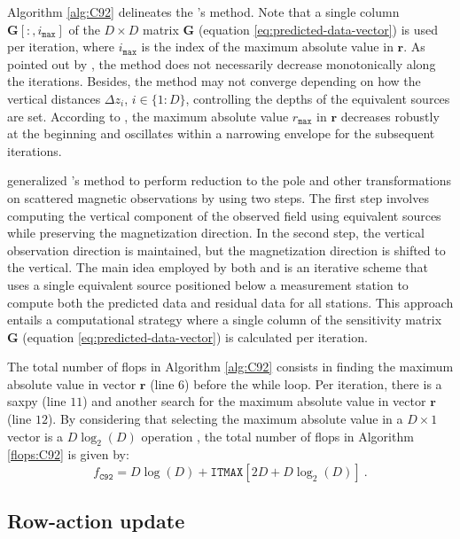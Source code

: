 Algorithm \ref{alg:C92} delineates the \citeauthor{cordell1992}'s method.
Note that a single column $\mathbf{G}[:, i_{\mathtt{max}}]$ of the $D \times D$ matrix $\mathbf{G}$ (equation \ref{eq:predicted-data-vector})
is used per iteration, where $i_{\mathtt{max}}$ is the index of the maximum absolute value in $\mathbf{r}$.
As pointed out by \cite{cordell1992}, the method does not necessarily decrease monotonically along the iterations.
Besides, the method may not converge depending on how the vertical distances $\Delta z_{i}$, $i \in \{1:D\}$, 
controlling the depths of the equivalent sources are set.
According to \cite{cordell1992}, the maximum absolute value $r_{\mathtt{max}}$ in $\mathbf{r}$ decreases robustly at the beginning 
and oscillates within a narrowing envelope for the subsequent iterations.

\cite{guspi-novara2009} generalized \citeauthor{cordell1992}'s method to
perform reduction to the pole and other transformations on scattered magnetic observations by using two steps. 
The first step involves computing the vertical component of the observed field using equivalent sources while preserving the magnetization direction.
In the second step, the vertical observation direction is maintained, but the magnetization direction is shifted to the vertical.
The main idea employed by both \cite{cordell1992} and \cite{guspi-novara2009} is an iterative scheme that 
uses a single equivalent source positioned below a measurement station to compute both the predicted data and residual data for all stations. 
This approach entails a computational strategy where a single column of the sensitivity matrix $\mathbf{G}$ (equation \ref{eq:predicted-data-vector}) 
is calculated per iteration.

The total number of flops in Algorithm \ref{alg:C92} consists in 
finding the maximum absolute value in vector $\mathbf{r}$ (line $6$) before the while loop. 
Per iteration, there is a saxpy (line $11$) and 
another search for the maximum absolute value in vector $\mathbf{r}$ (line $12$).
By considering that selecting the maximum absolute value in a $D \times 1$ vector is a $D \log_{2}(D)$ operation \citep[e.g.,][p. 420]{press-etal2007},
the total number of flops in Algorithm \ref{flops:C92} is given by:
\begin{equation}
	f_{\mathtt{C92}} = D \log(D) + \mathtt{ITMAX} \left[2D + D \log_{2}(D) \right] \: .
	\label{flops:C92}
\end{equation}

\subsection{Row-action update}

